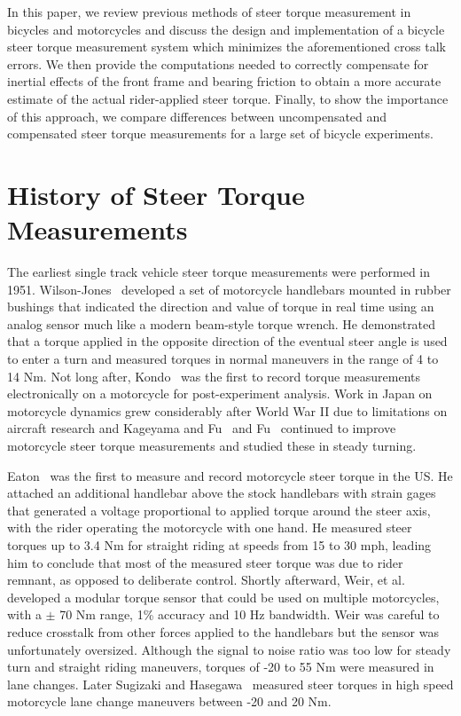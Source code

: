 \documentclass[10pt]{article}
\begin{document}
In this paper, we review previous methods of steer torque measurement in
bicycles and motorcycles and discuss the design and implementation of a bicycle
steer torque measurement system which minimizes the aforementioned cross talk
errors. We then provide the computations needed to correctly compensate for
inertial effects of the front frame and bearing friction to obtain a more
accurate estimate of the actual rider-applied steer torque. Finally, to show the
importance of this approach, we compare differences between uncompensated
and compensated steer torque measurements for a large set of bicycle
experiments.

\section*{History of Steer Torque Measurements}


The earliest single track vehicle steer torque measurements were
performed in 1951. Wilson-Jones~\cite{Wilson-Jones1951} developed a set of
motorcycle handlebars mounted in rubber bushings that indicated the direction
and value of torque in real time using an analog sensor much like 
a modern beam-style torque wrench. He demonstrated that a torque applied in the
opposite direction of the eventual steer angle is used to enter a turn and
measured torques in normal maneuvers in the range of 4 to 14 Nm. Not long after, 
Kondo~\cite{Kondo1955} was the first to record torque measurements electronically 
on a motorcycle for post-experiment analysis. Work in Japan on
motorcycle dynamics grew considerably after World War II due to limitations on
aircraft research and Kageyama and Fu~\cite{Kageyama1959} and Fu~\cite{Fu1965}
continued to improve motorcycle steer torque measurements and studied
these in steady turning.


Eaton~\cite{Eaton1973} was the first to measure and record motorcycle steer
torque in the US. He attached an additional handlebar above the
stock handlebars with strain gages that generated a voltage proportional to 
applied torque around the steer axis, with the rider operating the motorcycle
with one hand. He measured steer torques up to 3.4 Nm for straight riding at
speeds from 15 to 30 mph, leading him to conclude that most of the measured
steer torque was due to rider remnant, as opposed to deliberate control. Shortly 
afterward, Weir, et al.~\cite{Weir1979a} developed a modular torque sensor that
could be used on multiple motorcycles, with a $\pm$ 70 Nm range, 1\%
accuracy and 10 Hz bandwidth. Weir was careful to reduce crosstalk from other
forces applied to the handlebars but the sensor was unfortunately oversized. Although
the signal to noise ratio was too low for steady turn and straight riding
maneuvers,  torques of -20 to 55 Nm were measured in lane changes. Later
 Sugizaki and Hasegawa~\cite{Sugizaki1988} measured steer torques in high speed
motorcycle lane change maneuvers between -20 and 20 Nm.
\end{document}
